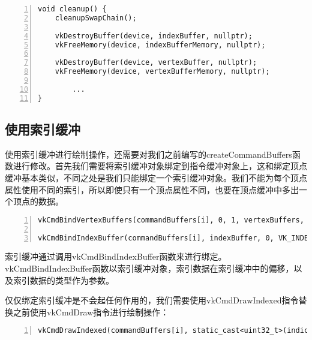 \documentclass{ctexart}
\begin{document}
\begin{lstlisting}[language={[ANSI]C},keywordstyle=\color{blue!70},commentstyle=\color{red!50!green!50!blue!50},frame=shadowbox, rulesepcolor=\color{red!20!green!20!blue!20},basicstyle=\small,numbers=left, numberstyle=\tiny,breaklines=true]
void cleanup() {
	cleanupSwapChain();

	vkDestroyBuffer(device, indexBuffer, nullptr);
	vkFreeMemory(device, indexBufferMemory, nullptr);

	vkDestroyBuffer(device, vertexBuffer, nullptr);
	vkFreeMemory(device, vertexBufferMemory, nullptr);

		...
}
\end{lstlisting}

\subsection{使用索引缓冲}

使用索引缓冲进行绘制操作，还需要对我们之前编写的createCommandBuffers函数进行修改。首先我们需要将索引缓冲对象绑定到指令缓冲对象上，这和绑定顶点缓冲基本类似，不同之处是我们只能绑定一个索引缓冲对象。我们不能为每个顶点属性使用不同的索引，所以即使只有一个顶点属性不同，也要在顶点缓冲中多出一个顶点的数据。

\begin{lstlisting}[language={[ANSI]C},keywordstyle=\color{blue!70},commentstyle=\color{red!50!green!50!blue!50},frame=shadowbox, rulesepcolor=\color{red!20!green!20!blue!20},basicstyle=\small,numbers=left, numberstyle=\tiny,breaklines=true]
vkCmdBindVertexBuffers(commandBuffers[i], 0, 1, vertexBuffers, offsets);

vkCmdBindIndexBuffer(commandBuffers[i], indexBuffer, 0, VK_INDEX_TYPE_UINT16);
\end{lstlisting}

索引缓冲通过调用vkCmdBindIndexBuffer函数来进行绑定。vkCmdBindIndexBuffer函数以索引缓冲对象，索引数据在索引缓冲中的偏移，以及索引数据的类型作为参数。

仅仅绑定索引缓冲是不会起任何作用的，我们需要使用vkCmdDrawIndexed指令替换之前使用vkCmdDraw指令进行绘制操作：

\begin{lstlisting}[language={[ANSI]C},keywordstyle=\color{blue!70},commentstyle=\color{red!50!green!50!blue!50},frame=shadowbox, rulesepcolor=\color{red!20!green!20!blue!20},basicstyle=\small,numbers=left, numberstyle=\tiny,breaklines=true]
vkCmdDrawIndexed(commandBuffers[i], static_cast<uint32_t>(indices.size()), 1, 0, 0, 0);
\end{lstlisting}
\end{document}
